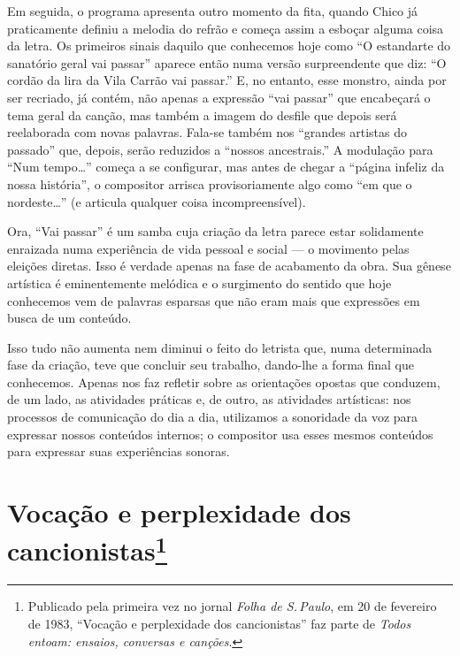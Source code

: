 Em seguida, o programa apresenta outro momento da fita, quando Chico já
praticamente definiu a melodia do refrão e começa assim a esboçar alguma
coisa da letra. Os primeiros sinais daquilo que conhecemos hoje como ``O
estandarte do sanatório geral vai passar'' aparece então numa versão
surpreendente que diz: ``O cordão da lira da Vila Carrão vai passar.''
E, no entanto, esse monstro, ainda por ser recriado, já contém, não
apenas a expressão ``vai passar'' que encabeçará o tema geral da canção,
mas também a imagem do desfile que depois será reelaborada com novas
palavras. Fala-se também nos ``grandes artistas do passado'' que,
depois, serão reduzidos a ``nossos ancestrais.'' A modulação para ``Num
tempo\ldots'' começa a se configurar, mas antes de chegar a ``página
infeliz da nossa história'', o compositor arrisca provisoriamente algo
como ``em que o nordeste\ldots'' (e articula qualquer coisa
incompreensível).

Ora, ``Vai passar'' é um samba cuja criação da letra parece estar
solidamente enraizada numa experiência de vida pessoal e social
 --- o movimento pelas eleições diretas. Isso é verdade apenas na fase de
acabamento da obra. Sua gênese artística é eminentemente melódica e o
surgimento do sentido que hoje conhecemos vem de palavras esparsas que
não eram mais que expressões em busca de um conteúdo.

Isso tudo não aumenta nem diminui o feito do letrista que, numa determinada fase da criação, teve que concluir seu trabalho, dando-lhe a
forma final que conhecemos. Apenas nos faz refletir sobre as orientações
opostas que conduzem, de um lado, as atividades práticas e, de outro, as
atividades artísticas: nos processos de comunicação do dia a dia,
utilizamos a sonoridade da voz para expressar nossos conteúdos internos;
o compositor usa esses mesmos conteúdos para expressar suas experiências
sonoras.


\chapter{Vocação e perplexidade dos cancionistas\footnote{Publicado pela primeira vez no jornal \textit{Folha de S.\,Paulo}, em 20 de fevereiro de 1983, ``Vocação e perplexidade dos
cancionistas'' faz parte de \textit{Todos entoam: ensaios, conversas e canções}.}}


